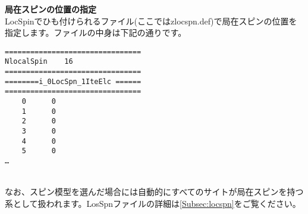 \begin{description}
\item {\bf 局在スピンの位置の指定}\\
LocSpinでひも付けられるファイル(ここではzlocspn.def)で局在スピンの位置を指定します。ファイルの中身は下記の通りです。\\
\begin{minipage}{15cm}
\begin{screen}
\begin{verbatim}
================================ 
NlocalSpin    16  
================================ 
========i_0LocSpn_1IteElc ====== 
================================ 
    0      0
    1      0
    2      0
    3      0
    4      0
    5      0
…
\end{verbatim}
\end{screen}
\end{minipage}
~\\
なお、スピン模型を選んだ場合には自動的にすべてのサイトが局在スピンを持つ系として扱われます。LosSpnファイルの詳細は\ref{Subsec:locspn}をご覧ください。
\end{description}

